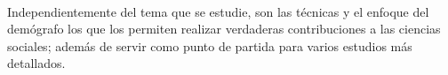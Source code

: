 \documentclass[11pt,spanish,letterpaper]{article}
\theoremstyle{plain}
\begin{document}
\\
Independientemente del tema que se estudie, son las t\'ecnicas y el enfoque del dem\'ografo los que los permiten realizar verdaderas contribuciones a las ciencias sociales; adem\'as de servir como punto de partida para varios estudios m\'as detallados. 


\end{document}
